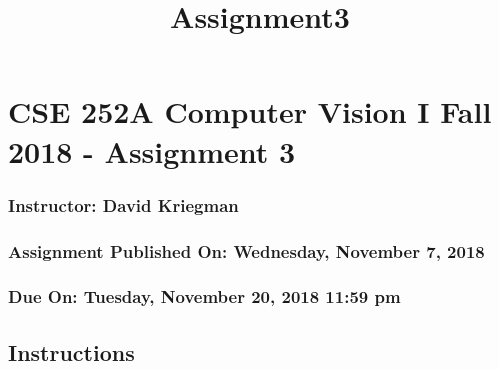 \documentclass[11pt]{article}
\title{Assignment3}
\begin{document}
    
    
    \maketitle
    
    

    
    \hypertarget{cse-252a-computer-vision-i-fall-2018---assignment-3}{%
\section{CSE 252A Computer Vision I Fall 2018 - Assignment
3}\label{cse-252a-computer-vision-i-fall-2018---assignment-3}}

\hypertarget{instructor-david-kriegman}{%
\subsubsection{Instructor: David
Kriegman}\label{instructor-david-kriegman}}

\hypertarget{assignment-published-on-wednesday-november-7-2018}{%
\subsubsection{Assignment Published On: Wednesday, November 7,
2018}\label{assignment-published-on-wednesday-november-7-2018}}

\hypertarget{due-on-tuesday-november-20-2018-1159-pm}{%
\subsubsection{Due On: Tuesday, November 20, 2018 11:59
pm}\label{due-on-tuesday-november-20-2018-1159-pm}}

\hypertarget{instructions}{%
\subsection{Instructions}\label{instructions}}
\end{document}
